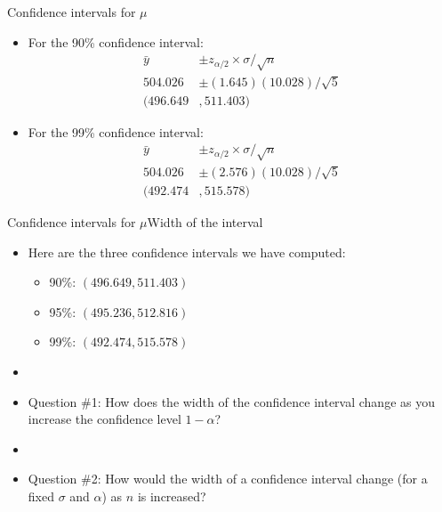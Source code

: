 \documentclass[xcolor=dvipsnames]{beamer}
\begin{document}
\begin{frame}{Confidence intervals for $\mu$}
	\begin{itemize}
		
		\item For the 90\% confidence interval: 
		\begin{align*}
			\bar{y} &\pm z_{\alpha / 2} \times \sigma / \sqrt{n} \\
			504.026 &\pm (1.645)(10.028)/\sqrt{5} \\
			(496.649&, 511.403)
		\end{align*}  \pause
		
		\item For the 99\% confidence interval: 
		\begin{align*}
		\bar{y} &\pm z_{\alpha / 2} \times \sigma / \sqrt{n} \\
		504.026 &\pm (2.576)(10.028)/\sqrt{5} \\
		(492.474&, 515.578)
		\end{align*}
		
	\end{itemize}
\end{frame}

\begin{frame}{Confidence intervals for $\mu$}{Width of the interval}
	\begin{itemize}
		\item Here are the three confidence intervals we have computed:
		\begin{itemize}
			\item 90\%: $(496.649, 511.403)$
			\item 95\%: $(495.236, 512.816)$
			\item 99\%: $(492.474, 515.578)$
		\end{itemize}  \pause
	\item[]
	\item Question \#1: How does the width of the confidence interval change as you increase the confidence level $1-\alpha$?  \pause
	\item[]
	\item Question \#2: How would the width of a confidence interval change (for a fixed $\sigma$ and $\alpha$) as $n$ is increased?
	\end{itemize}
\end{frame}
\end{document}

